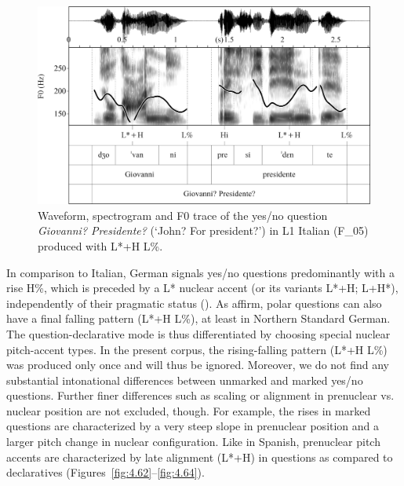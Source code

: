 \begin{figure}


\includegraphics[width=\textwidth]{figures/Figure_4.61.png}



\caption{Waveform, spectrogram and F0 trace of the yes/no question \textit{Giovanni? Presidente?} (‘John? For president?’) in L1 Italian (F\_05) produced with L*+H L\%.}
\label{fig:4.61}
\end{figure}


In comparison to Italian, German signals yes/no questions predominantly with a rise H\%, which is preceded by a L* nuclear accent (or its variants L*+H; L+H*), independently of their pragmatic status (\citealt{Féry1993, GriceBaumann2002, Kügler2003, Michalsky2017, BraunEtAl2018}). As \citet{PetroneNiebuhr2014} affirm, polar questions can also have a final falling pattern (L*+H L\%), at least in Northern Standard German. The question-declarative mode is thus differentiated by choosing special nuclear pitch-accent types. In the present corpus, the rising-falling pattern (L*+H L\%) was produced only once and will thus be ignored. Moreover, we do not find any substantial intonational differences between unmarked and marked yes/no questions. Further finer differences such as scaling or alignment in prenuclear vs. nuclear position are not excluded, though. For example, the rises in marked questions are characterized by a very steep slope in prenuclear position and a larger pitch change in nuclear configuration. Like in Spanish, prenuclear pitch accents are characterized by late alignment (L*+H) in questions as compared to declaratives (Figures~\ref{fig:4.62}--\ref{fig:4.64}).


